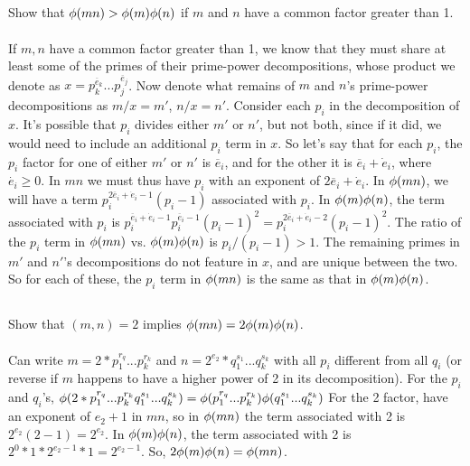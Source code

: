 \documentclass{article}
\begin{document}
\subsection{}
Show that $\phi(mn) > \phi(m)\phi(n)$ if $m$ and $n$ have a common factor greater than 1.\\~\\
If $m, n$ have a common factor greater than 1, we know that they must share at least
some of the primes of their prime-power decompositions, whose product
we denote as $x = p_k^{\overline{e}_k}...p_j^{\overline{e}_j}$.
Now denote what remains of $m$ and $n$'s prime-power decompositions
as $m/x = m'$, $n/x = n'$.
Consider each $p_i$ in the decomposition of $x$.
It's possible that $p_i$ divides either $m'$ or $n'$, but not both,
since if it did, we would need to include an additional $p_i$ term in $x$.
So let's say that for each $p_i$, the $p_i$ factor for one of either $m'$ or $n'$
is $\overline{e}_i$, and for the other it is $\overline{e}_i + \dot{e}_i$,
where $\dot{e_i} \geq 0$.
In $mn$ we must thus have $p_i$ with an exponent of $2\overline{e}_i + \dot{e}_i$.
In $\phi(mn)$, we will have a term $p_i^{2\overline{e}_i + \dot{e}_i - 1}(p_i - 1)$
associated with $p_i$.
In $\phi(m)\phi(n)$, the term associated with $p_i$ is
$p_i^{\overline{e}_i + \dot{e}_i - 1}p_i^{\overline{e}_i - 1}(p_i - 1)^2
= p_i^{2\overline{e}_i + \dot{e}_i - 2}(p_i - 1)^2$.
The ratio of the $p_i$ term in $\phi(mn)$ vs. $\phi(m)\phi(n)$ is
$p_i/(p_i - 1) > 1$.
The remaining primes in $m'$ and $n'$'s decompositions do not feature in $x$,
and are unique between the two.
So for each of these, the $p_i$ term in $\phi(mn)$ is the same as that in $\phi(m)\phi(n)$.

\subsection{}
Show that $(m, n) = 2$ implies $\phi(mn) = 2\phi(m)\phi(n)$.\\~\\
Can write $m = 2*p_1^{r_q}...p_k^{r_k}$ and
$n = 2^{e_2}*q_1^{s_1}...q_k^{s_k}$ with all $p_i$ different from all $q_i$
(or reverse if $m$ happens to have a higher power of 2 in its decomposition).
For the $p_i$ and $q_i$'s, $\phi(2*p_1^{r_q}...p_k^{r_k}q_1^{s_1}...q_k^{s_k}) = 
\phi(p_1^{r_q}...p_k^{r_k})\phi(q_1^{s_1}...q_k^{s_k})$
For the 2 factor, have an exponent of $e_2 + 1$ in $mn$,
so in $\phi(mn)$ the term associated with 2 is $2^{e_2}(2 - 1) = 2^{e_2}$.
In $\phi(m)\phi(n)$, the term associated with 2 is $2^0*1*2^{e_2-1}*1 = 2^{e_2-1}$.
So, $2\phi(m)\phi(n) = \phi(mn)$.
\end{document}
